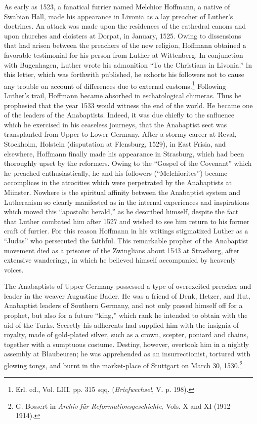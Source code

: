 As early as 1523, a fanatical furrier named Melchior Hoffmann,
a native of Swabian Hall, made his appearance in Livonia as a lay
preacher of Luther’s doctrines. An attack was made upon the residences
of the cathedral canons and upon churches and cloisters at
Dorpat, in January, 1525. Owing to dissensions that had arisen between
the preachers of the new religion, Hoffmann obtained a favorable testimonial
for his person from Luther at Wittenberg. In conjunction with Bugenhagen,
Luther wrote his admonition “To the
Christians in Livonia.” In this letter, which was forthwith published,
he exhorts his followers not to cause any trouble on account of differences
due to external customs.\footnote{Erl. ed., Vol. LIII, pp. 315 sqq. (\textit{Briefwechsel}, V. p. 198).}
Following Luther’s trail, Hoffmann
became absorbed in eschatological chimeras. Thus he prophesied that
the year 1533 would witness the end of the world. He became one
of the leaders of the Anabaptists. Indeed, it was due chiefly to the
snfluence which he exercised in his ceaseless journeys, that the Anabaptist
sect was transplanted from Upper to Lower Germany. After
a stormy career at Reval, Stockholm, Holstein (disputation at Flensburg,
1529), in East Frisia, and elsewhere, Hoffmann finally made
his appearance in Strasburg, which had been thoroughly upset by the
reformers. Owing to the “Gospel of the Covenant” which he preached
enthusiastically, he and his followers (“Melchiorites”) became accomplices
in the atrocities which were perpetrated by the Anabaptists
at Miinster. Nowhere is the spiritual affinity between the Anabaptist
system and Lutheranism so clearly manifested as in the internal experiences
and inspirations which moved this “apostolic herald,” as he
described himself, despite the fact that Luther combated him after
1527 and wished to see him return to his former craft of furrier. For
this reason Hoffmann in his writings stigmatized Luther as a “Judas”
who persecuted the faithful. This remarkable prophet of the Anabaptist
movement died as a prisoner of the Zwinglians about 1543 at Strasburg,
after extensive wanderings, in which he believed himself accompanied by
heavenly voices.

The Anabaptists of Upper Germany possessed a type of overexcited preacher
and leader in the weaver Augustine Bader. He was a
friend of Denk, Hetzer, and Hut, Anabaptist leaders of Southern
Germany, and not only passed himself off for a prophet, but also for
a future “king,” which rank he intended to obtain with the aid of
the Turks. Secretly his adherents had supplied him with the insignia
of royalty, made of gold-plated silver, such as a crown, scepter,
poniard and chains, together with a sumptuous costume. Destiny,
however, overtook him in a nightly assembly at Blaubeuren; he was
apprehended as an insurrectionist, tortured with glowing tongs, and
burnt in the market-place of Stuttgart on March 30, 1530.\footnote
{G. Bossert in \textit{Archiv für Reformationsgeschichte}, Vols. X and XI (1912-1914).}

